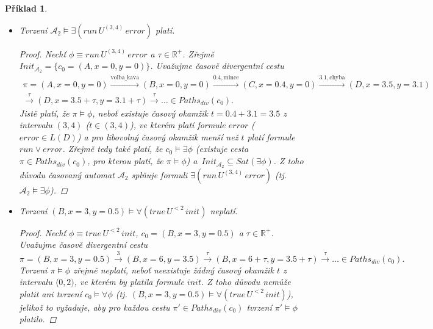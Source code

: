 \documentclass[a4paper]{article}
\let\pred\mathit
\theoremstyle{task}
\newtheorem{task}{Příklad}
\begin{document}
\begin{task}
\begin{itemize}
        \item Tvrzení $\mathcal{A}_2 \models \exists (\pred{run}\, U^{(3, 4)}\, \pred{error})$ platí.
        
        \begin{proof}
            Nechť $\phi \equiv \pred{run}\, U^{(3, 4)}\, \pred{error}$ a $\tau \in \mathbb{R}^+$. Zřejmě $\mathit{Init}_{\mathcal{A}_2} = \{c_0 = (A, x = 0, y = 0)\}$. Uvažujme časově divergentní cestu
            \begin{multline*}
            \pi = (A, x = 0, y = 0) \xrightarrow{\text{volba\_kava}} (B, x = 0, y = 0) \xrightarrow{0.4, \text{mince}} (C, x = 0.4, y = 0) \xrightarrow{3.1, \text{chyba}} (D, x = 3.5, y = 3.1)\\
            \xrightarrow{\tau} (D, x = 3.5 + \tau, y = 3.1 + \tau) \xrightarrow{\tau} \dots \in \mathit{Paths}_\mathit{div}(c_0).
            \end{multline*}
            Jistě platí, že $\pi \models \phi$, neboť existuje časový okamžik $t = 0.4 + 3.1 = 3.5$ z intervalu $(3, 4)$ ($t \in (3, 4)$), ve kterém platí formule $\pred{error}$ ($\pred{error} \in L(D)$) a pro libovolný časový okamžik menší než $t$ platí formule $\pred{run} \lor \pred{error}$. Zřejmě tedy také platí, že $c_0 \models \exists \phi$ (existuje cesta $\pi \in \mathit{Paths}_\mathit{div}(c_0)$, pro kterou platí, že $\pi \models \phi$) a~$\mathit{Init}_{\mathcal{A}_2} \subseteq \mathit{Sat(\exists \phi)}$. Z toho důvodu časovaný automat $\mathcal{A}_2$ splňuje formuli $\exists (\pred{run}\, U^{(3, 4)}\, \pred{error})$ (tj. $\mathcal{A}_2 \models \exists \phi$).
        \end{proof}



        \item Tvrzení $(B, x = 3, y = 0.5) \models \forall (\pred{true}\, U^{<2}\, \pred{init})$ neplatí.

        \begin{proof}
            Nechť $\phi \equiv \pred{true}\, U^{<2}\, \pred{init}$, $c_0 = (B, x = 3, y = 0.5)$ a $\tau \in \mathbb{R}^+$. Uvažujme časově divergentní cestu
            $$
            \pi = (B, x = 3, y = 0.5) \xrightarrow{3} (B, x = 6, y = 3.5) \xrightarrow{\tau} (B, x = 6 + \tau, y = 3.5 + \tau) \xrightarrow{\tau} \dots \in \mathit{Paths}_\mathit{div}(c_0).
            $$
            Tvrzení $\pi \models \phi$ zřejmě neplatí, neboť neexistuje žádný časový okamžik $t$ z intervalu $\langle 0, 2)$, ve kterém by platila formule $\pred{init}$. Z toho důvodu nemůže platit ani tvrzení $c_0 \models \forall \phi$ (tj. $(B, x = 3, y = 0.5) \models \forall (\pred{true}\, U^{<2}\, \pred{init})$), jelikož to vyžaduje, aby pro každou cestu $\pi' \in \mathit{Paths}_\mathit{div}(c_0)$ tvrzení $\pi' \models \phi$ platilo.
        \end{proof}




\end{itemize}
\end{task}
\end{document}
